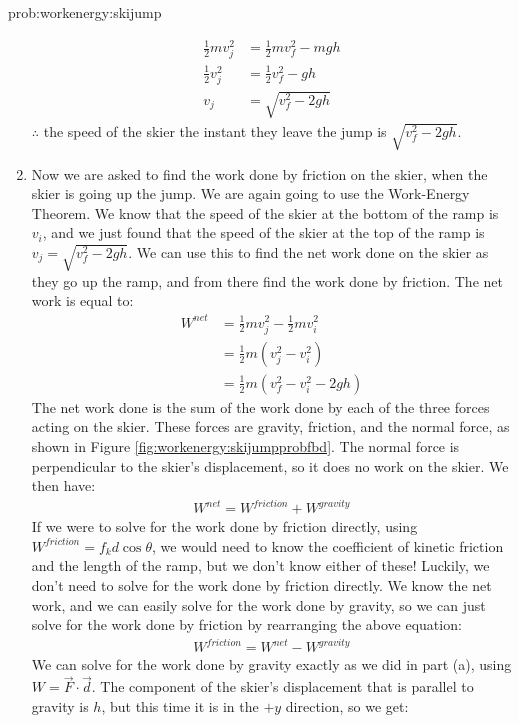 \begin{solution}{prob:workenergy:skijump}
\begin{enumerate}[label=\alph*)]
\begin{align*}
\frac{1}{2}mv_j^2&=\frac{1}{2}mv_f^2-mgh\\
\frac{1}{2}v_j^2&=\frac{1}{2}v_f^2-gh\\
v_j&=\sqrt{v_f^2-2gh}
\end{align*}
$\therefore$ the speed of the skier the instant they leave the jump is $\sqrt{v_f^2-2gh}$.
\item Now we are asked to find the work done by friction on the skier, when the skier is going up the jump. We are again going to use the Work-Energy Theorem. We know that the speed of the skier at the bottom of the ramp is $v_i$, and we just found that the speed of the skier at the top of the ramp is $v_j=\sqrt{v_f^2-2gh}$. We can use this to find the net work done on the skier as they go up the ramp, and from there find the work done by friction. The net work is equal to:
\begin{align*}
W^{net}&=\frac{1}{2}mv_j^2-\frac{1}{2}mv_i^2\\
&=\frac{1}{2}m(v_j^2-v_i^2)\\
&=\frac{1}{2}m(v_f^2-v_i^2-2gh)
\end{align*}
The net work done is the sum of the work done by each of the three forces acting on the skier. These forces are gravity, friction, and the normal force, as shown in Figure \ref{fig:workenergy:skijumpprobfbd}.
The normal force is perpendicular to the skier's displacement, so it does no work on the skier. We then have:
\begin{align*}
W^{net}=W^{friction}+W^{gravity}
\end{align*}
If we were to solve for the work done by friction directly, using $W^{friction}=f_kd\cos\theta$, we would need to know the coefficient of kinetic friction and the length of the ramp, but we don't know either of these! Luckily, we don't need to solve for the work done by friction directly. We know the net work, and we can easily solve for the work done by gravity, so we can just solve for the work done by friction by rearranging the above equation:
\begin{align*}
W^{friction}=W^{net}-W^{gravity}
\end{align*}
We can solve for the work done by gravity exactly as we did in part (a), using $W=\vec F \cdot \vec d$. The component of the skier's displacement that is parallel to gravity is $h$, but this time it is in the $+y$ direction, so we get:
\begin{align*}

\end{align*}
\end{enumerate}
\end{solution}
